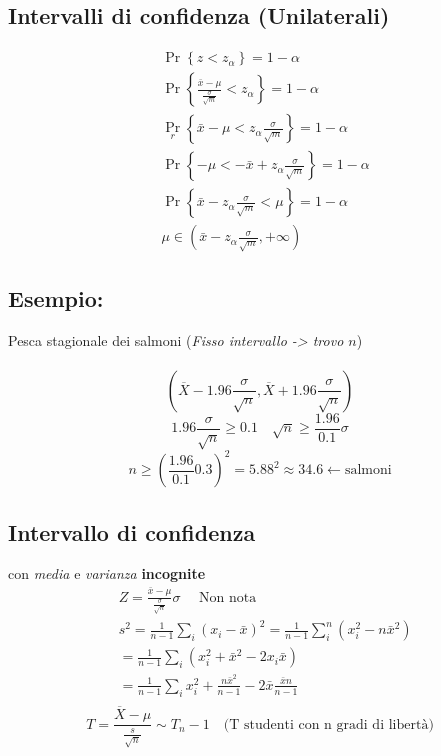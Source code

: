 \documentclass[]{article}
\begin{document}
    \subsection{Intervalli di confidenza (Unilaterali)}
    \begin{equation*}
        \begin{aligned}
        & \operatorname{Pr}\left\{z<z_\alpha\right\}=1-\alpha \\
        & \operatorname{Pr}\left\{\frac{\bar{x}-\mu}{\frac{\sigma}{\sqrt{m}}}<z_\alpha\right\}=1-\alpha \\
        & \operatorname{Pr}_r\left\{\bar{x}-\mu<z_\alpha \frac{\sigma}{\sqrt{m}}\right\}=1-\alpha \\
        & \operatorname{Pr}\left\{-\mu<-\bar{x}+z_\alpha \frac{\sigma}{\sqrt{m}}\right\}=1-\alpha \\
        & \operatorname{Pr}\left\{\bar{x}-z_\alpha \frac{\sigma}{\sqrt{m}}<\mu\right\}=1-\alpha \\
        & \mu \in\left(\bar{x}-z_\alpha \frac{\sigma}{\sqrt{m}},+\infty\right)
        \end{aligned}
    \end{equation*}
    \subsection{Esempio:} Pesca stagionale dei salmoni (\textit{Fisso intervallo -> trovo $n$}) \\
     \\
    \[ (\overline{X} - 1.96 \frac{\sigma}{\sqrt{n}}, \overline{X} + 1.96 \frac{\sigma}{\sqrt{n}}) \]
    \[ 1.96 \frac{\sigma}{\sqrt{n}} \geq 0.1 \quad \sqrt{n} \geq \frac{1.96}{0.1} \sigma \]
    \[ n \geq (\frac{1.96}{0.1} 0.3)^2 = 5.88^2 \approx 34.6 \leftarrow \text{salmoni} \]
    \subsection{Intervallo di confidenza} con \textit{media} e \textit{varianza} \textbf{incognite}
    \begin{equation*}
        \begin{aligned}
            & Z=\frac{\bar{x}-\mu}{\frac{\sigma}{\sqrt{n}}} \sigma \quad \text{ Non nota} \\
            & s^2=\frac{1}{n-1} \sum_i\left(x_i-\bar{x}\right)^2=\frac{1}{n-1} \sum_i^n\left(x_i^2-n \bar{x}^2\right) \\
            & =\frac{1}{n-1} \sum_i\left(x_i^2+\bar{x}^2-2 x_i \bar{x}\right) \\
            & =\frac{1}{n-1} \sum_i x_i^2+\frac{n \bar{x}^2}{n-1}-2 \bar{x} \frac{\bar{x} n}{n-1} \\
        \end{aligned}
    \end{equation*}
    \[ T = \frac{\overline{X} - \mu}{\frac{s}{\sqrt{n}}} \sim T_n - 1 \quad \text{(T studenti con n gradi di libertà)} \]
\end{document}
